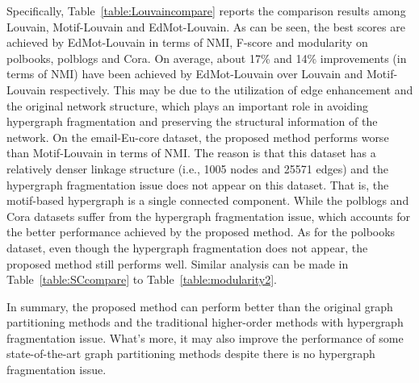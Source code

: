 \documentclass[sigconf]{acmart}
\begin{document}
Specifically, Table~\ref{table:Louvaincompare} reports the comparison results among Louvain, Motif-Louvain and EdMot-Louvain. As can be seen, the best scores are achieved by EdMot-Louvain in terms of NMI, F-score and modularity on polbooks, polblogs and Cora. On average, about 17\% and 14\% improvements (in terms of NMI) have been achieved by EdMot-Louvain over Louvain and Motif-Louvain respectively. This may be due to the utilization of edge enhancement and the original network structure, which plays an important role in avoiding hypergraph fragmentation and preserving the structural information of the network.
On the email-Eu-core dataset, the proposed method performs worse than Motif-Louvain in terms of NMI. The reason is that this dataset has a relatively denser linkage structure (i.e., 1005 nodes and 25571 edges) and the hypergraph fragmentation issue does not appear on this dataset. That is, the motif-based hypergraph is a single connected component. While the polblogs and Cora datasets suffer from the hypergraph fragmentation issue, which accounts for the better performance achieved by the proposed method. As for the polbooks dataset, even though the hypergraph fragmentation does not appear, the proposed method still performs well. Similar analysis can be made in Table~\ref{table:SCcompare} to Table~\ref{table:modularity2}.

In summary, the proposed method can perform better than the original graph partitioning methods and the traditional higher-order methods with hypergraph fragmentation issue. What's more, it may also improve the performance of some state-of-the-art graph partitioning methods despite there is no hypergraph fragmentation issue.
\end{document}
